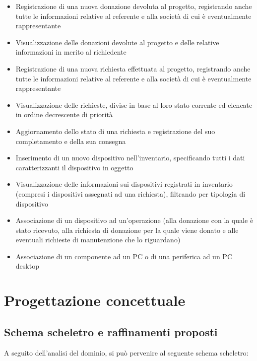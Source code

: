 \documentclass[a4paper,12pt]{report}
\begin{document}
\begin{itemize}
	\item Registrazione di una nuova donazione devoluta al progetto, registrando anche tutte le informazioni relative al referente e alla società di cui è eventualmente rappresentante
	\item Visualizzazione delle donazioni devolute al progetto e delle relative informazioni in merito al richiedente
    \item Registrazione di una nuova richiesta effettuata al progetto, registrando anche tutte le informazioni relative al referente e alla società di cui è eventualmente rappresentante
	\item Visualizzazione delle richieste, divise in base al loro stato corrente ed elencate in ordine decrescente di priorità
	\item Aggiornamento dello stato di una richiesta e registrazione del suo completamento e della sua consegna
	\item Inserimento di un nuovo dispositivo nell'inventario, specificando tutti i dati caratterizzanti il dispositivo in oggetto
    \item Visualizzazione delle informazioni sui dispositivi registrati in inventario (compresi i dispositivi assegnati ad una richiesta), filtrando per tipologia di dispositivo
	\item Associazione di un dispositivo ad un'operazione (alla donazione con la quale è stato ricevuto, alla richiesta di donazione per la quale viene donato e alle eventuali richieste di manutenzione che lo riguardano)
    \item Associazione di un componente ad un PC o di una periferica ad un PC desktop
\end{itemize}


\chapter{Progettazione concettuale}

\section{Schema scheletro e raffinamenti proposti}

A seguito dell'analisi del dominio, si può pervenire al seguente schema scheletro:
\end{document}
